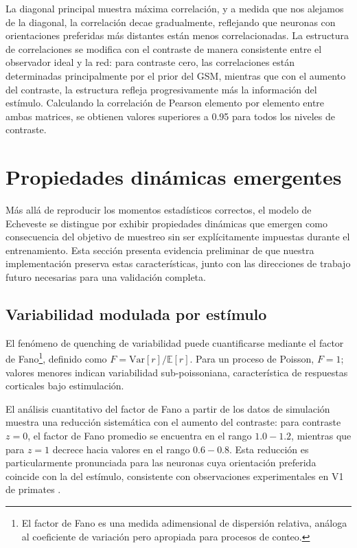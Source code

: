 La diagonal principal muestra máxima correlación, y a medida que nos alejamos de la diagonal, la correlación decae gradualmente, reflejando que neuronas con orientaciones preferidas más distantes están menos correlacionadas. La estructura de correlaciones se modifica con el contraste de manera consistente entre el observador ideal y la red: para contraste cero, las correlaciones están determinadas principalmente por el prior del \acrshort{GSM}, mientras que con el aumento del contraste, la estructura refleja progresivamente más la información del estímulo. Calculando la correlación de Pearson elemento por elemento entre ambas matrices, se obtienen valores superiores a 0.95 para todos los niveles de contraste.


\section{Propiedades dinámicas emergentes}
\label{sec:res_dynamics}

Más allá de reproducir los momentos estadísticos correctos, el modelo de Echeveste se distingue por exhibir propiedades dinámicas que emergen como consecuencia del objetivo de muestreo sin ser explícitamente impuestas durante el entrenamiento. Esta sección presenta evidencia preliminar de que nuestra implementación preserva estas características, junto con las direcciones de trabajo futuro necesarias para una validación completa.

\subsection{Variabilidad modulada por estímulo}
\label{subsec:res_fano}

El fenómeno de quenching de variabilidad puede cuantificarse mediante el factor de Fano\footnote{El factor de Fano es una medida 
adimensional de dispersión relativa, análoga al coeficiente de variación pero apropiada para 
procesos de conteo.}, definido como $F = \text{Var}[r] / \mathbb{E}[r]$. Para un proceso de Poisson, $F = 1$; valores menores indican variabilidad sub-poissoniana, característica de respuestas corticales bajo estimulación.

El análisis cuantitativo del factor de Fano a partir de los datos de simulación muestra una reducción sistemática con el aumento del contraste: para contraste $z = 0$, el factor de Fano promedio se encuentra en el rango $1.0 - 1.2$, mientras que para $z = 1$ decrece hacia valores en el rango $0.6 - 0.8$. Esta reducción es particularmente pronunciada para las neuronas cuya orientación preferida coincide con la del estímulo, consistente con observaciones experimentales en \acrshort{V1} de primates \citep{echeveste2020cortical}.



